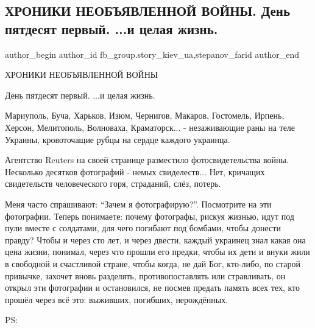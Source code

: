  
 
 
 
 
 
\subsection{ХРОНИКИ НЕОБЪЯВЛЕННОЙ ВОЙНЫ. День пятдесят первый. ...и целая жизнь.}
\label{sec:15_04_2022.fb.fb_group.story_kiev_ua.1.hroniki}
 
\ifcmt
 author_begin
   author_id fb_group.story_kiev_ua,stepanov_farid
 author_end
\fi

ХРОНИКИ НЕОБЪЯВЛЕННОЙ ВОЙНЫ

День пятдесят первый. ...и целая жизнь.

Мариуполь, Буча, Харьков, Изюм, Чернигов, Макаров, Гостомель, Ирпень, Херсон,
Мелитополь, Волноваха, Краматорск... - незаживающие раны на теле Украины,
кровоточащие рубцы на сердце каждого украинца. 

Агентство Reuters на своей странице разместило фотосвидетельства войны.
Несколько десятков фотографий - немых свиделеств... Нет, кричащих
свидетельств человеческого горя, страданий, слёз, потерь. 


Меня часто спрашивают: \enquote{Зачем я фотографирую?}. Посмотрите на эти фотографии.
Теперь понимаете: почему фотографы, рискуя жизнью, идут под пули вместе с
солдатами, для чего погибают под бомбами, чтобы донести правду? Чтобы и через
сто лет, и через двести, каждый украинец знал какая она цена жизни, понимал,
через что прошли его предки, чтобы их дети и внуки жили в свободной и
счастливой стране, чтобы когда, не дай Бог, кто-либо, по старой привычке,
захочет вновь разделять, противопоставлять или стравливать, он открыл эти
фотографии и остановился, не посмев предать память всех тех, кто прошёл через
всё это: выживших, погибших, нерождённых. 

PS:

